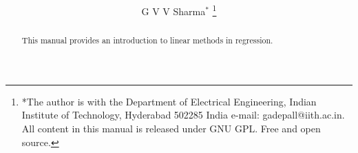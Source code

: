 \documentclass[journal,12pt,twocolumn]{IEEEtran}
\renewcommand\thesection{\arabic{section}}
\begin{document}
\let\StandardTheFigure\thefigure
\renewcommand{\thefigure}{\thesection}



\makeatletter
{}
\makeatother

\let\StandardTheFigure\thefigure
\let\StandardTheTable\thetable
\let\vec\mathbf





\def\putbox#1#2#3{\makebox[0in][l]{\makebox[#1][l]{}\raisebox{\baselineskip}[0in][0in]{\raisebox{#2}[0in][0in]{#3}}}}
     \def\rightbox#1{\makebox[0in][r]{#1}}
     \def\centbox#1{\makebox[0in]{#1}}
     \def\topbox#1{\raisebox{-\baselineskip}[0in][0in]{#1}}
     \def\midbox#1{\raisebox{-0.5\baselineskip}[0in][0in]{#1}}

\vspace{3cm}

\title{ 
}

\author{ G V V Sharma$^{*}$%
	\thanks{*The author is with the Department
		of Electrical Engineering, Indian Institute of Technology, Hyderabad
		502285 India e-mail:  gadepall@iith.ac.in. All content in this manual is released under GNU GPL.  Free and open source.}
	
}	

\maketitle

\tableofcontents

\bigskip

\renewcommand{\thefigure}{\theenumi}
\renewcommand{\thetable}{\theenumi}


\begin{abstract}
	
This manual provides an introduction to linear methods in regression.
\end{abstract}
%
\end{document}
